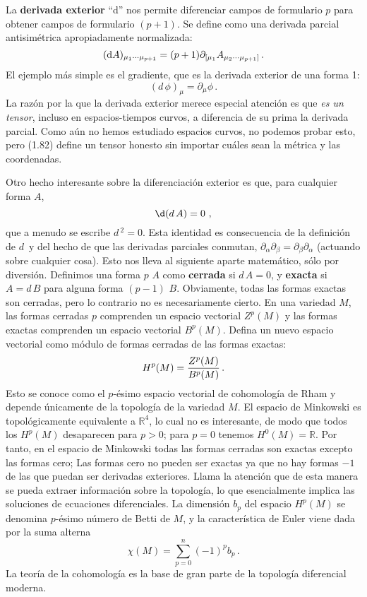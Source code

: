 \documentclass[11pt,b5paper,openany,twoside]{book}
\newcommand{\p}[1]{{\partial_{#1}}}
\begin{document}
La {\bf derivada exterior} ``d'' nos permite diferenciar campos de formulario $p$ para obtener campos de formulario $(p+1)$.
Se define como una derivada parcial antisimétrica apropiadamente normalizada:
\begin{equation}
({\rm d}A)_{\mu_1\cdots\mu_{p+1}} = (p+1)\p{[\mu_1}
A_{\mu_2\cdots \mu_{p+1}]}\,.\label{1.82}
\end{equation}
El ejemplo más simple es el gradiente, que es la derivada exterior de una forma 1:
\begin{equation}
( d\, \phi)_\mu = \p{\mu} \phi\,.\label{1.83}
\end{equation}
La razón por la que la derivada exterior merece especial atención es que \textit{es un tensor}, incluso en espacios-tiempos curvos, a diferencia de su prima la derivada parcial.
Como aún no hemos estudiado espacios curvos, no podemos probar esto, pero (1.82) define un tensor honesto sin importar cuáles sean la métrica y las coordenadas.

Otro hecho interesante sobre la diferenciación exterior es que, para cualquier forma $A$,
\begin{equation}
\d( d\,A) =0\ ,\label{1.84}
\end{equation}
que a menudo se escribe $ d\,^2 =0$.
Esta identidad es consecuencia de la definición de $ d\,$ y del hecho de que las derivadas parciales conmutan, $\p\alpha\p\beta = \p\beta\p\alpha$ (actuando sobre cualquier cosa).
Esto nos lleva al siguiente aparte matemático, sólo por diversión.
Definimos una forma $p$ $A$ como {\bf cerrada} si $ d\,A=0$, y {\bf exacta} si $A =  d\,B$ para alguna forma $(p-1)$ $B$.
Obviamente, todas las formas exactas son cerradas, pero lo contrario no es necesariamente cierto.
En una variedad $M$, las formas cerradas $p$ comprenden un espacio vectorial $Z^p(M)$ y las formas exactas comprenden un espacio vectorial $B^p(M)$.
Defina un nuevo espacio vectorial como módulo de formas cerradas de las formas exactas:
\begin{equation}
H^p(M) = {{Z^p(M)}\over{B^p(M)}}\,.\label{1.85}
\end{equation}
Esto se conoce como el $p$-ésimo espacio vectorial de cohomología de Rham y depende únicamente de la topología de la variedad $M$.
El espacio de Minkowski es topológicamente equivalente a $\mathbb{R}^4$, lo cual no es interesante, de modo que todos los $H^p(M)$ desaparecen para $p>0$; para $p=0$ tenemos $H^0(M)=\mathbb{R}$.
Por tanto, en el espacio de Minkowski todas las formas cerradas son exactas excepto las formas cero; Las formas cero no pueden ser exactas ya que no hay formas $-1$ de las que puedan ser derivadas exteriores.
Llama la atención que de esta manera se pueda extraer información sobre la topología, lo que esencialmente implica las soluciones de ecuaciones diferenciales.
La dimensión $b_p$ del espacio $H^p(M)$ se denomina $p$-ésimo número de Betti de $M$, y la característica de Euler viene dada por la suma alterna
\begin{equation}
\chi(M) = \sum_{p=0}^{n} (-1)^p b_p\,.\label{1.86}
\end{equation}
La teoría de la cohomología es la base de gran parte de la topología diferencial moderna.
\end{document}
